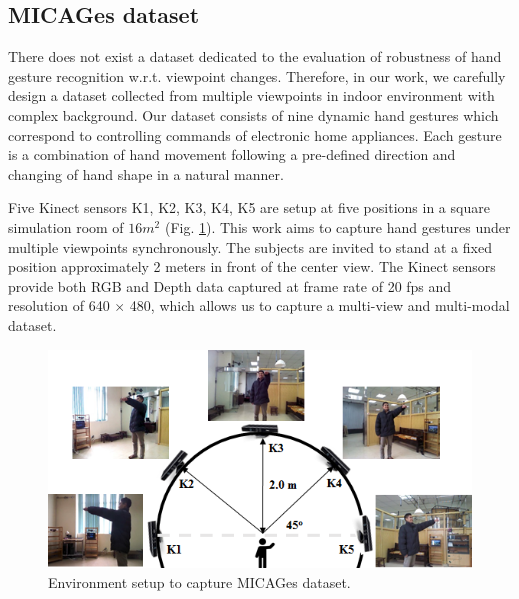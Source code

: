 
\subsection{MICAGes dataset}
    There does not exist a dataset dedicated to the evaluation of robustness of hand gesture recognition w.r.t. viewpoint changes. Therefore, in our work, we carefully design a dataset collected from multiple viewpoints in indoor environment with complex background. Our dataset consists of nine dynamic hand gestures which correspond to controlling commands of electronic home appliances. Each gesture is a combination of hand movement following a pre-defined direction and changing of hand shape in a natural manner.

    Five Kinect sensors {K1, K2, K3, K4, K5} are setup at five positions in a square simulation room of $16m^2$ (Fig. \ref{Fig:MICAGes1}). This work aims to capture hand gestures under multiple viewpoints synchronously. The subjects are invited to stand at a fixed position approximately 2 meters in front of the center view. The Kinect sensors provide both RGB and Depth data captured at frame rate of 20 fps and resolution of 640 $\times$ 480, which allows us to capture a multi-view and multi-modal dataset.
    \begin{figure}[h]
        \centering
        \includegraphics[width=0.8\linewidth]{figs/MICAGes1.png}
        \caption{Environment setup to capture MICAGes dataset.}
        \label{Fig:MICAGes1}
    \end{figure}

